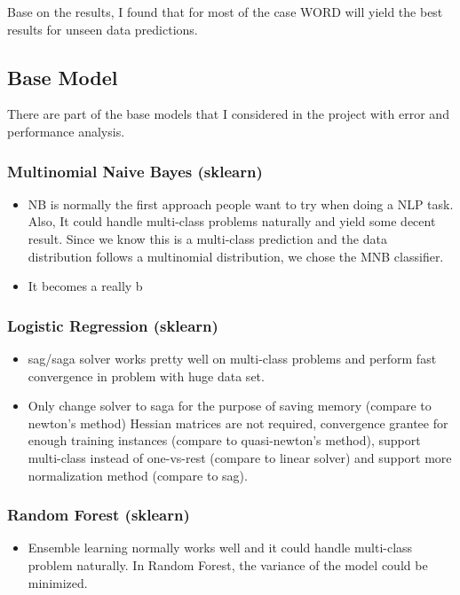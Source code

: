 \documentclass[11pt]{article}
\begin{document}
Base on the results, I found that for most of the case WORD will yield the best results for 
unseen data predictions.

\subsection{Base Model}

There are part of the base models that I considered in the project with error and performance analysis.

\subsubsection{Multinomial Naive Bayes (sklearn)}
\begin{itemize}
      \item 
            NB is normally the first approach people 
            want to try when doing a NLP task. Also, It could handle multi-class
            problems naturally and yield some decent result. Since we know this
            is a multi-class prediction and the data distribution follows a multinomial
            distribution, we chose the MNB classifier.
      \item It becomes a really b
\end{itemize}

\subsubsection{Logistic Regression (sklearn)}
\begin{itemize}
      \item sag/saga solver works pretty well on 
            multi-class problems and perform fast convergence in problem with huge data set.
      \item Only change solver to saga for the purpose of saving memory
            (compare to newton's method) Hessian matrices are not required, 
            convergence grantee for enough training instances (compare to 
            quasi-newton's method),
            support multi-class instead of one-vs-rest (compare to linear solver) 
            and support more normalization method (compare to sag).
\end{itemize}

\subsubsection{Random Forest (sklearn)}
\begin{itemize}
      \item Ensemble learning normally works well and 
            it could handle multi-class problem naturally. In Random Forest, the
            variance of the model could be minimized.
\end{itemize}
\end{document}
